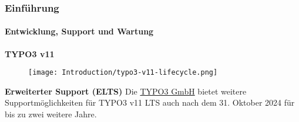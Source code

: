 %

\begin{frame}[fragile]
	\frametitle{Einführung}
	\framesubtitle{Entwicklung, Support und Wartung}

	\textbf{TYPO3 v11}

	\begin{figure}
		\texttt{[image: Introduction/typo3-v11-lifecycle.png]}
	\end{figure}

	\textbf{Erweiterter Support (ELTS)}\newline
	\smaller
		Die \href{https://typo3.com}{TYPO3 GmbH} bietet weitere Supportmöglichkeiten
		für TYPO3 v11 LTS auch nach dem 31. Oktober 2024 für bis zu zwei weitere
		Jahre.
	\normalsize

\end{frame}

